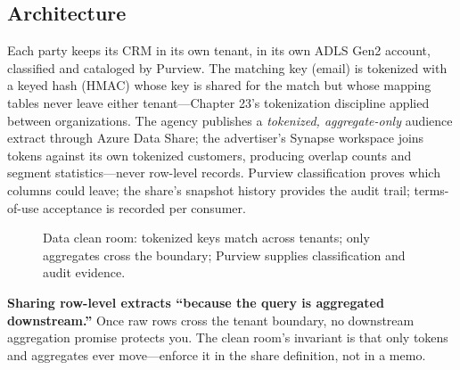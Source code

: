 \subsection{Architecture}
Each party keeps its CRM in its own tenant, in its own ADLS Gen2 account, classified and cataloged by Purview. The matching key (email) is tokenized with a keyed hash (HMAC) whose key is shared for the match but whose mapping tables never leave either tenant---Chapter 23's tokenization discipline applied between organizations. The agency publishes a \emph{tokenized, aggregate-only} audience extract through Azure Data Share; the advertiser's Synapse workspace joins tokens against its own tokenized customers, producing overlap counts and segment statistics---never row-level records. Purview classification proves which columns could leave; the share's snapshot history provides the audit trail; terms-of-use acceptance is recorded per consumer.

\begin{figure}[H]
    \centering
    \caption{Data clean room: tokenized keys match across tenants; only aggregates cross the boundary; Purview supplies classification and audit evidence.}
    \label{fig:ch8-clean-room}
\end{figure}

\begin{pitfall}
\textbf{Sharing row-level extracts ``because the query is aggregated downstream.''} Once raw rows cross the tenant boundary, no downstream aggregation promise protects you. The clean room's invariant is that only tokens and aggregates ever move---enforce it in the share definition, not in a memo.
\end{pitfall}

